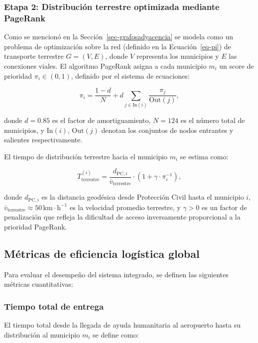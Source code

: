 \documentclass[
  spanish,
  us-letterpaper,
]{scrreprt}
\numberwithin{equation}{section}
\begin{document}
\subsubsection{Etapa 2: Distribución terrestre optimizada mediante
PageRank}\label{etapa-2-distribuciuxf3n-terrestre-optimizada-mediante-pagerank}

Como se mencionó en la Sección~\ref{sec-grafosadyacencia} se modela como
un problema de optimización sobre la red (definido en la
Ecuación~\ref{eq-pi}) de transporte terrestre \(G = (V, E)\), donde
\(V\) representa los municipios y \(E\) las conexiones viales. El
algoritmo PageRank asigna a cada municipio \(m_i\) un score de prioridad
\(\pi_i \in (0,1)\), definido por el sistema de ecuaciones:

\[
\pi_i = \frac{1-d}{N} + d \sum_{j \in \text{In}(i)} \frac{\pi_j}{\text{Out}(j)},
\]

donde \(d = 0.85\) es el factor de amortiguamiento, \(N = 124\) es el
número total de municipios, y \(\text{In}(i)\), \(\text{Out}(j)\)
denotan los conjuntos de nodos entrantes y salientes respectivamente.

El tiempo de distribución terrestre hacia el municipio \(m_i\) se estima
como:

\[
T_{\text{terrestre}}^{(i)} = \frac{d_{\text{PC}, i}}{\bar{v}_{\text{terrestre}}} \cdot \left(1 + \gamma \cdot \pi_i^{-1}\right),
\]

donde \(d_{\text{PC}, i}\) es la distancia geodésica desde Protección
Civil hasta el municipio \(i\),
\(\bar{v}_{\text{terrestre}} \approx 50 \, \mathrm{km \cdot h^{-1}}\) es
la velocidad promedio terrestre, y \(\gamma > 0\) es un factor de
penalización que refleja la dificultad de acceso inversamente
proporcional a la prioridad PageRank.

\subsection{Métricas de eficiencia logística
global}\label{muxe9tricas-de-eficiencia-loguxedstica-global}

Para evaluar el desempeño del sistema integrado, se definen las
siguientes métricas cuantitativas:

\subsubsection{Tiempo total de entrega}\label{tiempo-total-de-entrega}

El tiempo total desde la llegada de ayuda humanitaria al aeropuerto
hasta su distribución al municipio \(m_i\) se define como:
\end{document}
